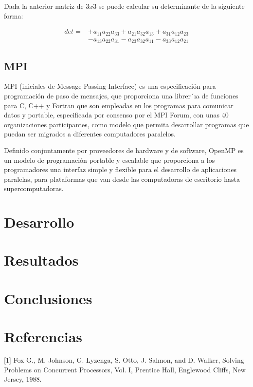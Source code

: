 \documentclass[10pt]{IEEEtran}
\begin{document}
Dada la anterior matriz de $3x3$ se puede calcular su determinante de la siguiente forma:

\begin{align}
  det = &+
  a_{11} a_{22} a_{33} +
  a_{21} a_{32} a_{13} +
  a_{31} a_{12} a_{23}\\
  &-
  a_{13} a_{22} a_{31} -
  a_{23} a_{32} a_{11} -
  a_{33} a_{12} a_{21}
\end{align}

\subsection{MPI}
MPI (iniciales de Message Passing Interface) es una especificación para programación de paso de mensajes, que proporciona una librer´ıa de funciones para C, C++ y Fortran que son empleadas en los programas para comunicar datos y portable, especificada por consenso por el MPI Forum, con unas 40 organizaciones participantes, como modelo que permita desarrollar programas que puedan ser migrados a diferentes computadores paralelos.

Definido conjuntamente por proveedores de hardware y de software, OpenMP es un modelo de programación portable y escalable que proporciona a los programadores una interfaz simple y flexible para el desarrollo de aplicaciones paralelas, para plataformas que van desde las computadoras de escritorio hasta supercomputadoras.

\section{Desarrollo}

\section{Resultados}

\section{Conclusiones}

\section{Referencias}
{[1]} Fox G., M. Johnson, G. Lyzenga, S. Otto, J. Salmon, and D. Walker, Solving Problems on Concurrent Processors, Vol. I, Prentice Hall, Englewood Cliffs, New Jersey, 1988.
\end{document}
